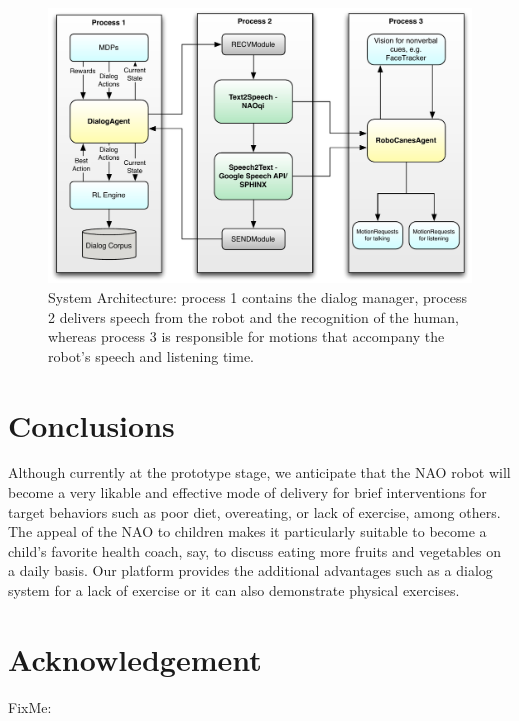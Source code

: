 \documentclass[letterpaper]{article}
\begin{document}
\begin{figure}[!t] 
\centering 
\includegraphics[width=.45\textwidth]{figures/system} 
\caption{System Architecture: process 1 contains the dialog manager, process 2 delivers speech from 
the robot and
the recognition of the human, whereas process 3 is responsible for motions that accompany the 
robot's
speech and listening time.} 
\label{fig:system} 
\end{figure}


\section*{Conclusions} 

Although currently at the prototype stage, we anticipate that the NAO robot will become a very 
likable and effective mode of delivery for brief interventions for target behaviors such as poor 
diet, overeating, or lack of exercise, among others.  The appeal of the NAO to children 
\cite{belpaeme2012multimodal} makes it particularly suitable to become a child's favorite health 
coach, say, to discuss eating more fruits and vegetables on a daily basis. Our platform 
provides the additional advantages such as a dialog system for a lack of exercise or  it can 
also demonstrate physical exercises.


\section*{Acknowledgement}
{\color{red}
FixMe:
}

       
   
\end{document}
